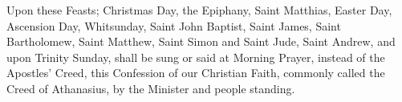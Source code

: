 
\begin{rubric}
Upon these Feasts; Christmas Day, the Epiphany, Saint Matthias, Easter Day, Ascension Day, Whitsunday, Saint John Baptist, Saint James, Saint Bartholomew, Saint Matthew, Saint Simon and Saint Jude, Saint Andrew, and upon Trinity Sunday, shall be sung or said at Morning Prayer, instead of the Apostles' Creed, this Confession of our Christian Faith, commonly called the Creed of Athanasius, by the Minister and people standing.
\end{rubric}



\clearpage
